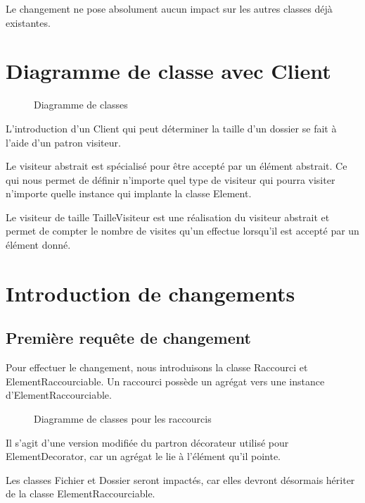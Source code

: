 \documentclass{article}
\begin{document}
  Le changement ne pose absolument aucun impact sur les autres classes déjà
  existantes.

  \section{Diagramme de classe avec \textsf{Client}}
  \begin{sidewaysfigure}
    \centering
    \resizebox{\textwidth}{!}{}
    \caption{Diagramme de classes}
  \end{sidewaysfigure}

  L'introduction d'un Client qui peut déterminer la taille d'un dossier se fait
  à l'aide d'un patron visiteur.

  Le visiteur abstrait est spécialisé pour être accepté par un élément abstrait.
  Ce qui nous permet de définir n'importe quel type de visiteur qui pourra
  visiter n'importe quelle instance qui implante la classe \textsf{Element}.

  Le visiteur de taille \textsf{TailleVisiteur} est une réalisation du visiteur
  abstrait et permet de compter le nombre de visites qu'un effectue lorsqu'il
  est accepté par un élément donné.

  \section{Introduction de changements}

  \subsection{Première requête de changement}
  Pour effectuer le changement, nous introduisons la classe \textsf{Raccourci}
  et \textsf{ElementRaccourciable}. Un raccourci possède un agrégat vers une
  instance d'\textsf{ElementRaccourciable}.

  \begin{figure}
    \centering
    \resizebox{\textwidth}{!}{}
    \caption{Diagramme de classes pour les raccourcis}
  \end{figure}

  Il s'agit d'une version modifiée du partron décorateur utilisé pour
  \textsf{ElementDecorator}, car un agrégat le lie à l'élément qu'il pointe.

  Les classes \textsf{Fichier} et \textsf{Dossier} seront impactés, car elles
  devront désormais hériter de la classe \textsf{ElementRaccourciable}.
\end{document}

